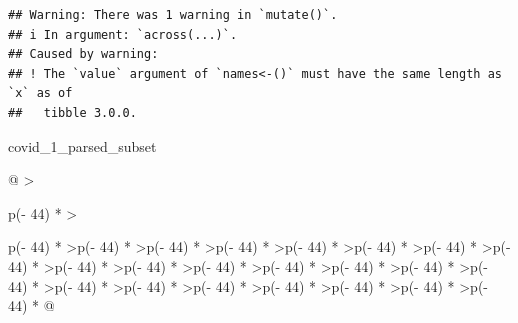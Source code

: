 \documentclass[
]{article}
\newenvironment{Shaded}{}{}
\newcommand{\NormalTok}[1]{#1}
\begin{document}
\begin{verbatim}
## Warning: There was 1 warning in `mutate()`.
## i In argument: `across(...)`.
## Caused by warning:
## ! The `value` argument of `names<-()` must have the same length as `x` as of
##   tibble 3.0.0.
\end{verbatim}

\begin{Shaded}
\begin{Highlighting}[]
\NormalTok{covid\_1\_parsed\_subset}
\end{Highlighting}
\end{Shaded}

\begin{longtable}[]{@{}
  >{\raggedright\arraybackslash}p{(\columnwidth - 44\tabcolsep) * }
  >{\raggedright\arraybackslash}p{(\columnwidth - 44\tabcolsep) * }
  >{\raggedleft\arraybackslash}p{(\columnwidth - 44\tabcolsep) * }
  >{\raggedleft\arraybackslash}p{(\columnwidth - 44\tabcolsep) * }
  >{\raggedleft\arraybackslash}p{(\columnwidth - 44\tabcolsep) * }
  >{\raggedleft\arraybackslash}p{(\columnwidth - 44\tabcolsep) * }
  >{\raggedleft\arraybackslash}p{(\columnwidth - 44\tabcolsep) * }
  >{\raggedleft\arraybackslash}p{(\columnwidth - 44\tabcolsep) * }
  >{\raggedleft\arraybackslash}p{(\columnwidth - 44\tabcolsep) * }
  >{\raggedleft\arraybackslash}p{(\columnwidth - 44\tabcolsep) * }
  >{\raggedleft\arraybackslash}p{(\columnwidth - 44\tabcolsep) * }
  >{\raggedleft\arraybackslash}p{(\columnwidth - 44\tabcolsep) * }
  >{\raggedleft\arraybackslash}p{(\columnwidth - 44\tabcolsep) * }
  >{\raggedleft\arraybackslash}p{(\columnwidth - 44\tabcolsep) * }
  >{\raggedleft\arraybackslash}p{(\columnwidth - 44\tabcolsep) * }
  >{\raggedleft\arraybackslash}p{(\columnwidth - 44\tabcolsep) * }
  >{\raggedleft\arraybackslash}p{(\columnwidth - 44\tabcolsep) * }
  >{\raggedleft\arraybackslash}p{(\columnwidth - 44\tabcolsep) * }
  >{\raggedleft\arraybackslash}p{(\columnwidth - 44\tabcolsep) * }
  >{\raggedleft\arraybackslash}p{(\columnwidth - 44\tabcolsep) * }
  >{\raggedleft\arraybackslash}p{(\columnwidth - 44\tabcolsep) * }
  >{\raggedleft\arraybackslash}p{(\columnwidth - 44\tabcolsep) * }
  >{\raggedleft\arraybackslash}p{(\columnwidth - 44\tabcolsep) * }@{}}
\toprule\noalign{}
\begin{minipage}[b]{\linewidth}\raggedright

\end{minipage}
\end{longtable}
\end{document}
